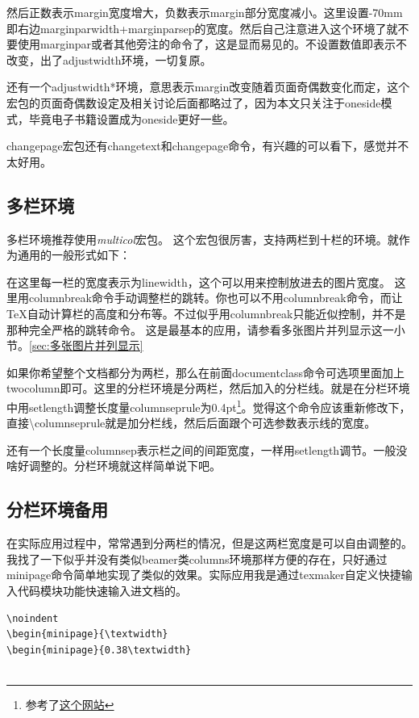 \documentclass[12pt,oneside]{book}
\begin{document}
\begin{common-format}
然后正数表示margin宽度增大，负数表示margin部分宽度减小。这里设置-70mm即右边marginparwidth+marginparsep的宽度。然后自己注意进入这个环境了就不要使用marginpar或者其他旁注的命令了，这是显而易见的。不设置数值即表示不改变，出了adjustwidth环境，一切复原。

还有一个adjustwidth*环境，意思表示margin改变随着页面奇偶数变化而定，这个宏包的页面奇偶数设定及相关讨论后面都略过了，因为本文只关注于oneside模式，毕竟电子书籍设置成为oneside更好一些。

changepage宏包还有changetext和changepage命令，有兴趣的可以看下，感觉并不太好用。


\subsection{多栏环境}
多栏环境推荐使用\emph{multicol}宏包。
这个宏包很厉害，支持两栏到十栏的环境。就作为通用的一般形式如下：

在这里每一栏的宽度表示为linewidth，这个可以用来控制放进去的图片宽度。
这里用columnbreak命令手动调整栏的跳转。你也可以不用columnbreak命令，而让\TeX 自动计算栏的高度和分布等。不过似乎用columnbreak只能近似控制，并不是那种完全严格的跳转命令。
这是最基本的应用，请参看多张图片并列显示这一小节。\ref{sec:多张图片并列显示}



\begin{multicols}{2}
\setlength{\columnseprule}{0.4pt}
如果你希望整个文档都分为两栏，那么在前面documentclass命令可选项里面加上twocolumn即可。这里的分栏环境是分两栏，然后加入的分栏线。就是在分栏环境中用setlength调整长度量columnseprule为0.4pt\footnote{参考了\href{http://texblog.org/tag/columnseprule/}{这个网站}}。觉得这个命令应该重新修改下，直接\textbackslash columnseprule就是加分栏线，然后后面跟个可选参数表示线的宽度。

还有一个长度量columnsep表示栏之间的间距宽度，一样用setlength调节。一般没啥好调整的。分栏环境就这样简单说下吧。
\end{multicols}


\subsection{分栏环境备用}
在实际应用过程中，常常遇到分两栏的情况，但是这两栏宽度是可以自由调整的。我找了一下似乎并没有类似beamer类columns环境那样方便的存在，只好通过minipage命令简单地实现了类似的效果。实际应用我是通过texmaker自定义快捷输入代码模块功能快速输入进文档的。
\begin{Verbatim}
\noindent
\begin{minipage}{\textwidth}
\begin{minipage}{0.38\textwidth}


\end{Verbatim}
\end{common-format}
\end{document}
